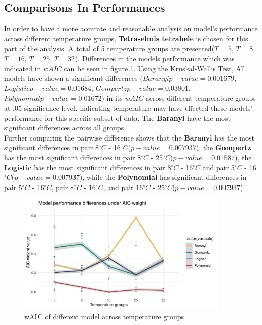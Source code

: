 \documentclass[11pt]{article}
\begin{document}
\subsection{Comparisons In Performances}\label{comparison}
In order to have a more accurate and reasonable analysis on model's performance across different temperature groups, \textbf{Tetraselmis tetrahele} is chosen for this part of the analysis. A total of 5 temperature groups are presented($T=5$, $T=8$, $T=16$, $T=25$, $T=32$). Differences in the models performance which was indicated in $wAIC$ can be seen in figure \ref{fig:tempwaic}. Using the Kruskal-Wallis Test, All models have shown a significant differences ($Baranyi p-value = 0.001679$, $Logistic p-value = 0.01684$, $Gompertz p-value = 0.03801$, $Polynomial p-value = 0.01672$) in its $wAIC$ across different temperature groups at .05 significance level, indicating temperature may have effected these models' performance for this specific subset of data. The \textbf{Baranyi} have the most significant differences across all groups. \\ 
Further comparing the pairwise difference shows that the \textbf{Baranyi} has the most significant differences in pair 8$^\circ C$ - 16$^\circ C$($p-value = 0.007937$), the \textbf{Gompertz} has the most significant differences in pair 8$^\circ C$ - 25$^\circ C$($p-value = 0.01587$), the \textbf{Logistic} has the most significant differences in pair 8$^\circ C$ - 16$^\circ C$ and pair 5$^\circ C$ - 16$^\circ C$($p-value = 0.007937$), while the \textbf{Polynomial} has significant differences in pair 5$^\circ C$ - 16$^\circ C$, pair 8$^\circ C$ - 16$^\circ C$, and pair 16$^\circ C$ - 25$^\circ C$($p-value = 0.007937$).\\
\FloatBarrier 
\begin{figure}[!htbp]
    \centering
    \includegraphics[width=0.9\textwidth]{../Results/anaPlots/wAICtemp.pdf}
    \caption{wAIC of different model across temperature groups }
    \label{fig:tempwaic}
\end{figure}
\end{document}
